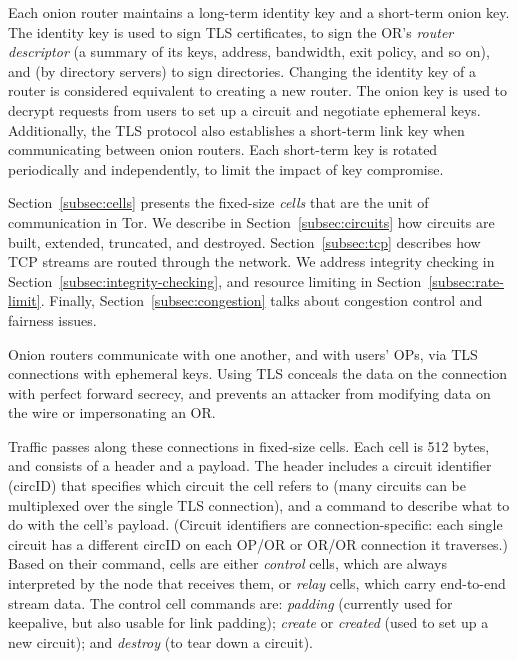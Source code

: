 \documentclass[times,10pt,twocolumn]{article}
\begin{document}
Each onion router maintains a long-term identity key and a short-term
onion key. The identity
key is used to sign TLS certificates, to sign the OR's \emph{router
descriptor} (a summary of its keys, address, bandwidth, exit policy,
and so on), and (by directory servers) to sign directories. Changing
the identity key of a router is considered equivalent to creating a
new router. The onion key is used to decrypt requests
from users to set up a circuit and negotiate ephemeral keys. Additionally,
the TLS protocol also establishes a short-term link key when communicating
between onion routers. Each short-term key is rotated periodically and
independently, to limit the impact of key compromise.

Section~\ref{subsec:cells} presents the fixed-size
\emph{cells} that are the unit of communication in Tor. We describe
in Section~\ref{subsec:circuits} how circuits are
built, extended, truncated, and destroyed. Section~\ref{subsec:tcp}
describes how TCP streams are routed through the network.  We address
integrity checking in Section~\ref{subsec:integrity-checking},
and resource limiting in Section~\ref{subsec:rate-limit}.
Finally,
Section~\ref{subsec:congestion} talks about congestion control and
fairness issues.

\label{subsec:cells}

Onion routers communicate with one another, and with users' OPs, via
TLS connections with ephemeral keys.  Using TLS conceals the data on
the connection with perfect forward secrecy, and prevents an attacker
from modifying data on the wire or impersonating an OR.

Traffic passes along these connections in fixed-size cells.  Each cell
is 512 bytes, %
and consists of a header and a payload. The header includes a circuit
identifier (circID) that specifies which circuit the cell refers to
(many circuits can be multiplexed over the single TLS connection), and
a command to describe what to do with the cell's payload.  (Circuit
identifiers are connection-specific: each single circuit has a different
circID on each OP/OR or OR/OR connection it traverses.)
Based on their command, cells are either \emph{control} cells, which are
always interpreted by the node that receives them, or \emph{relay} cells,
which carry end-to-end stream data.   The control cell commands are:
\emph{padding} (currently used for keepalive, but also usable for link
padding); \emph{create} or \emph{created} (used to set up a new circuit);
and \emph{destroy} (to tear down a circuit).
\end{document}
